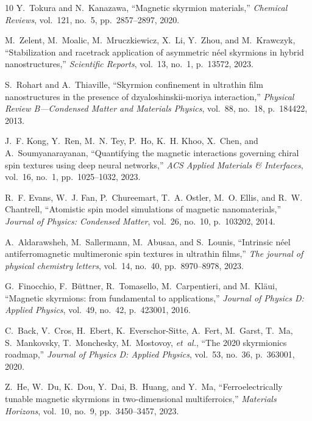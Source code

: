 \documentclass[final,5p,times,twocolumn]{elsarticle}
\begin{document}
\begin{thebibliography}{10}
Y.~Tokura and N.~Kanazawa, ``Magnetic skyrmion materials,'' {\em Chemical Reviews}, vol.~121, no.~5, pp.~2857--2897, 2020.

M.~Zelent, M.~Moalic, M.~Mruczkiewicz, X.~Li, Y.~Zhou, and M.~Krawczyk, ``Stabilization and racetrack application of asymmetric n{\'e}el skyrmions in hybrid nanostructures,'' {\em Scientific Reports}, vol.~13, no.~1, p.~13572, 2023.

S.~Rohart and A.~Thiaville, ``Skyrmion confinement in ultrathin film nanostructures in the presence of dzyaloshinskii-moriya interaction,'' {\em Physical Review B—Condensed Matter and Materials Physics}, vol.~88, no.~18, p.~184422, 2013.

J.~F. Kong, Y.~Ren, M.~N. Tey, P.~Ho, K.~H. Khoo, X.~Chen, and A.~Soumyanarayanan, ``Quantifying the magnetic interactions governing chiral spin textures using deep neural networks,'' {\em ACS Applied Materials \& Interfaces}, vol.~16, no.~1, pp.~1025--1032, 2023.

R.~F. Evans, W.~J. Fan, P.~Chureemart, T.~A. Ostler, M.~O. Ellis, and R.~W. Chantrell, ``Atomistic spin model simulations of magnetic nanomaterials,'' {\em Journal of Physics: Condensed Matter}, vol.~26, no.~10, p.~103202, 2014.

A.~Aldarawsheh, M.~Sallermann, M.~Abusaa, and S.~Lounis, ``Intrinsic n{\'e}el antiferromagnetic multimeronic spin textures in ultrathin films,'' {\em The journal of physical chemistry letters}, vol.~14, no.~40, pp.~8970--8978, 2023.

G.~Finocchio, F.~B{\"u}ttner, R.~Tomasello, M.~Carpentieri, and M.~Kl{\"a}ui, ``Magnetic skyrmions: from fundamental to applications,'' {\em Journal of Physics D: Applied Physics}, vol.~49, no.~42, p.~423001, 2016.

C.~Back, V.~Cros, H.~Ebert, K.~Everschor-Sitte, A.~Fert, M.~Garst, T.~Ma, S.~Mankovsky, T.~Monchesky, M.~Mostovoy, {\em et~al.}, ``The 2020 skyrmionics roadmap,'' {\em Journal of Physics D: Applied Physics}, vol.~53, no.~36, p.~363001, 2020.

Z.~He, W.~Du, K.~Dou, Y.~Dai, B.~Huang, and Y.~Ma, ``Ferroelectrically tunable magnetic skyrmions in two-dimensional multiferroics,'' {\em Materials Horizons}, vol.~10, no.~9, pp.~3450--3457, 2023.


\end{thebibliography}
\end{document}
